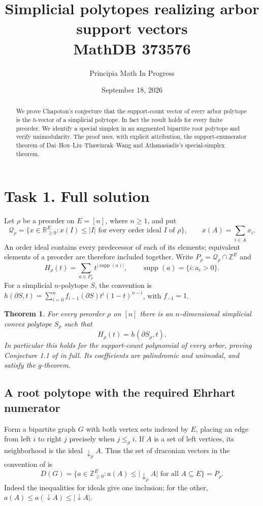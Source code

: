 \documentclass[11pt]{article}
\title{Simplicial polytopes realizing arbor support vectors\\\large MathDB 373576}
\author{Principia Math In Progress}
\date{September 18, 2026}
\newtheorem{theorem}{Theorem}
\newcommand{\Q}{\mathcal Q}
\newcommand{\supp}{\operatorname{supp}}
\begin{document}
\maketitle
\begin{abstract}
We prove Chapoton's conjecture that the support-count vector of every
arbor polytope is the $h$-vector of a simplicial polytope. In fact the
result holds for every finite preorder. We identify a special simplex
in an augmented bipartite root polytope and verify unimodularity.
The proof uses, with explicit attribution, the support-enumerator
theorem of Dai--Hou--Liu--Thawinrak--Wang and Athanasiadis's
special-simplex theorem.
\end{abstract}

\section*{Task 1. Full solution}
Let $\rho$ be a preorder on $E=[n]$, where $n\ge1$, and put
\[
 \Q_\rho=\{x\in\mathbb R_{\ge0}^{E}:x(I)\le |I|
                   \text{ for every order ideal $I$ of $\rho$}\},
 \qquad x(A)=\sum_{i\in A}x_i.
\]
An order ideal contains every predecessor of each of its elements;
equivalent elements of a preorder are therefore included together.
Write $P_\rho=\Q_\rho\cap\mathbb Z^E$ and
\[
 H_\rho(t)=\sum_{a\in P_\rho}t^{|\supp(a)|},
 \qquad \supp(a)=\{i:a_i>0\}.
\]
For a simplicial $n$-polytope $S$, the convention is
$h(\partial S,t)=\sum_{i=0}^n f_{i-1}(\partial S)t^i(1-t)^{n-i}$,
with $f_{-1}=1$.
\begin{theorem}\label{thm:main}
For every preorder $\rho$ on $[n]$ there is an $n$-dimensional
simplicial convex polytope $S_\rho$ such that
\[
 \boxed{H_\rho(t)=h(\partial S_\rho,t).}
\]
In particular this holds for the support-count polynomial of every
arbor, proving Conjecture 1.1 of \cite{AXY} in full. Its coefficients
are palindromic and unimodal, and satisfy the $g$-theorem.
\end{theorem}

\subsection*{A root polytope with the required Ehrhart numerator}
Form a bipartite graph $G$ with both vertex sets indexed by $E$,
placing an edge from left $i$ to right $j$ precisely when
$j\le_\rho i$. If $A$ is a set of left vertices, its neighborhood
is the ideal $\downarrow_\rho A$. Thus the set of draconian vectors
in the convention of \cite{D} is
\[
 D(G)=\{a\in\mathbb Z_{\ge0}^{E}:
                   a(A)\le |\downarrow_\rho A|\text{ for all }A\subseteq E\}
      =P_\rho.                                                    \tag{1}
\]
Indeed the inequalities for ideals give one inclusion; for the other,
$a(A)\le a(\downarrow A)\le|\downarrow A|$.
\end{document}
